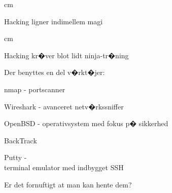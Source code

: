 \documentclass[20pt,landscape,a4paper,footrule]{foils}
\begin{document}


 cm

\centerline{Hacking ligner indimellem  magi}




 cm
\centerline{Hacking kr�ver blot lidt ninja-tr�ning}






\begin{list1}
\item Der benyttes en del v�rkt�jer:
\begin{list2}
\item nmap -  portscanner
\item Wireshark -  avanceret netv�rkssniffer
\item OpenBSD -  operativsystem med fokus
  p� sikkerhed
\item BackTrack 
\item Putty -
\\
terminal emulator med indbygget SSH
\end{list2}

\end{list1}

\vskip 2cm
\centerline{Er det fornuftigt at man kan hente dem?}
\end{document}
